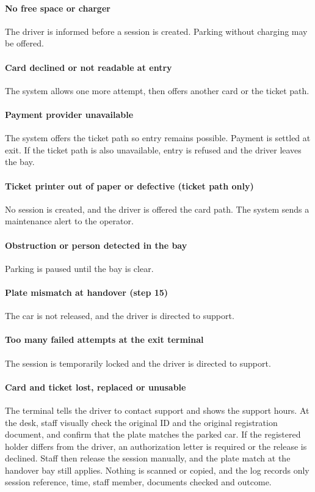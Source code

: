 \documentclass[11pt,a4paper]{article}
\begin{document}
\paragraph{No free space or charger}
The driver is informed before a session is created. Parking without
charging may be offered.

\paragraph{Card declined or not readable at entry}
The system allows one more attempt, then offers another card or the
ticket path.

\paragraph{Payment provider unavailable}
The system offers the ticket path so entry remains possible. Payment
is settled at exit. If the ticket path is also unavailable, entry is refused
and the driver leaves the bay.

\paragraph{Ticket printer out of paper or defective (ticket path only)}
No session is created, and the driver is offered the card path. The
system sends a maintenance alert to the operator.

\paragraph{Obstruction or person detected in the bay}
Parking is paused until the bay is clear.

\paragraph{Plate mismatch at handover (step 15)}
The car is not released, and the driver is directed to support.

\paragraph{Too many failed attempts at the exit terminal}
The session is temporarily locked and the driver is directed to
support.

\paragraph{Card and ticket lost, replaced or unusable}
The terminal tells the driver to contact support and shows the
support hours. At the desk, staff visually check the original ID and the
original registration document, and confirm that the plate matches
the parked car. If the registered holder differs from the driver, an
authorization letter is required or the release is declined. Staff then
release the session manually, and the plate match at the handover
bay still applies. Nothing is scanned or copied, and the log records
only session reference, time, staff member, documents checked and
outcome.
\end{document}
